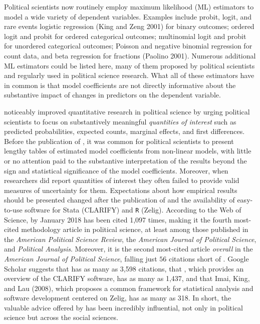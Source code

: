 \documentclass[11pt]{article}
\begin{document}
\thispagestyle{empty}

\onehalfspace

Political scientists now routinely employ maximum likelihood (ML) estimators to model a wide variety of dependent variables.
Examples include probit, logit, and rare events logistic regression (King and Zeng 2001) for binary outcomes; ordered logit and probit for ordered categorical outcomes; multinomial logit and probit for unordered categorical outcomes; Poisson and negative binomial regression for count data, and beta regression for fractions (Paolino 2001). 
Numerous additional ML estimators could be listed here, many of them proposed by political scientists and regularly used in political science research. 
What all of these estimators have in common is that model coefficients are not directly informative about the substantive impact of changes in predictors on the dependent variable.


\cite{KingTomzWittenberg2000} noticeably improved quantitative research in political science by urging political scientists to focus on substantively meaningful {\it quantities of interest} such as predicted probabilities, expected counts, marginal effects, and first differences.
Before the publication of \cite{KingTomzWittenberg2000}, it was common for political scientists to present lengthy tables of estimated model coefficients from non-linear models, with little or no attention paid to the substantive interpretation of the results beyond the sign and statistical significance of the model coefficients.
Moreover, when researchers did report quantities of interest they often failed to provide valid measures of uncertainty for them.
Expectations about how empirical results should be presented changed after the publication of \cite{KingTomzWittenberg2000} and the availability of easy-to-use software for Stata (CLARIFY) and \texttt{R} (Zelig).
According to the Web of Science, by January 2018 \cite{KingTomzWittenberg2000} has been cited 1,097 times, making it the fourth most-cited methodology article in political science, at least among those published in the \textit{American Political Science Review}, the \textit{American Journal of Political Science}, and \textit{Political Analysis}.
Moreover, it is the second most-cited article \textit{overall} in the \textit{American Journal of Political Science}, falling just $56$ citations short of \cite{BeckKatzTucker1998}.
Google Scholar suggests that \cite{KingTomzWittenberg2000} has as many as 3,598 citations, that \cite{TomzWittenbergKing2003}, which provides an overview of the CLARIFY software, has as many as 1,437, and that Imai, King, and Lau (2008), which proposes a common framework for statistical analysis and software development centered on Zelig, has as many as 318.
In short, the valuable advice offered by \cite{KingTomzWittenberg2000} has been incredibly influential, not only in political science but across the social sciences.
\end{document}
